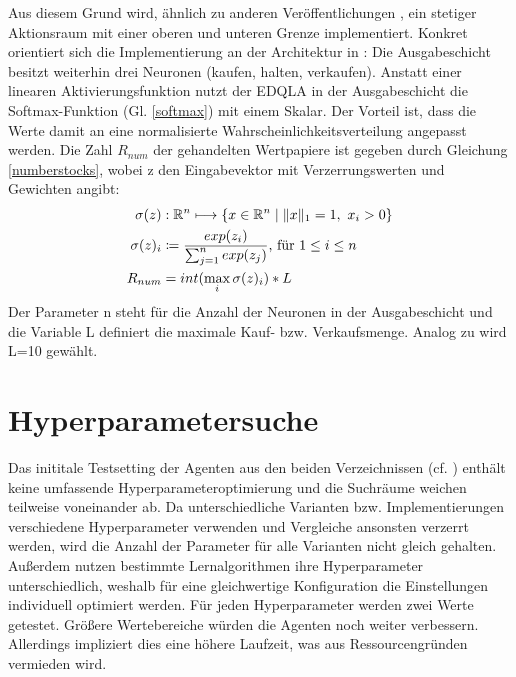 \begin{enumerate}[(i)]
Aus diesem Grund wird, ähnlich zu anderen Veröffentlichungen \parencite{théate2020application,improvementaction,direct}, ein stetiger Aktionsraum mit einer oberen und unteren Grenze implementiert.
Konkret orientiert sich die Implementierung an der Architektur in \parencite{improvementaction}: 
Die Ausgabeschicht besitzt weiterhin drei Neuronen (kaufen, halten, verkaufen).
Anstatt einer linearen Aktivierungsfunktion nutzt der \acs{EDQLA} in der Ausgabeschicht die Softmax-Funktion (Gl. \ref{softmax}) mit einem Skalar. Der Vorteil ist, dass die Werte damit an eine normalisierte Wahrscheinlichkeitsverteilung angepasst werden.
Die Zahl $R_{num}$ der gehandelten Wertpapiere ist gegeben durch Gleichung \ref{numberstocks}, wobei z den Eingabevektor mit Verzerrungswerten und Gewichten angibt:
\begin{align}
	\sigma(z)&:\mathbb{R}^n\longmapsto\{x\in\mathbb{R}^n\mid \Vert x\Vert _1=1,~x_i>0\} \\
	\sigma(z)_i&\coloneqq\frac{exp(z_i)}{\sum_{j=1}^n exp(z_j)} \textnormal{, für }1\leq i\leq n \label{softmax}\\
	R_{num}&=int(\max_i \sigma(z)_i)*L\label{numberstocks}
\end{align}
Der Parameter n steht für die Anzahl der Neuronen in der Ausgabeschicht und
die Variable L definiert die maximale Kauf- bzw. Verkaufsmenge. Analog zu \parencite{improvementaction} wird L=10 gewählt.
\end{enumerate}

\section{Hyperparametersuche}
\label{sec:hyperparameter}

Das inititale Testsetting der Agenten aus den beiden Verzeichnissen (cf. \parencite{repo1,repo2}) enthält keine umfassende Hyperparameteroptimierung und die Suchräume weichen teilweise voneinander ab.
Da unterschiedliche Varianten bzw. Implementierungen verschiedene Hyperparameter verwenden und Vergleiche ansonsten verzerrt werden, wird die Anzahl der Parameter für alle Varianten nicht gleich gehalten.
Außerdem nutzen bestimmte Lernalgorithmen ihre Hyperparameter unterschiedlich, weshalb für eine gleichwertige Konfiguration die Einstellungen individuell optimiert werden.
Für jeden Hyperparameter werden zwei Werte getestet. Größere Wertebereiche würden die Agenten noch weiter verbessern. Allerdings impliziert dies eine höhere Laufzeit, was aus Ressourcengründen vermieden wird.

